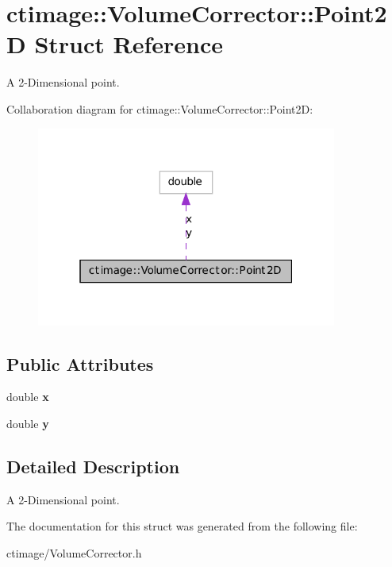 \hypertarget{structctimage_1_1_volume_corrector_1_1_point2_d}{
\section{ctimage::VolumeCorrector::Point2D Struct Reference}
\label{structctimage_1_1_volume_corrector_1_1_point2_d}
}


A 2-\/Dimensional point.  




Collaboration diagram for ctimage::VolumeCorrector::Point2D:\nopagebreak
\begin{figure}[H]
\begin{center}
\leavevmode
\includegraphics[width=280pt]{structctimage_1_1_volume_corrector_1_1_point2_d__coll__graph}
\end{center}
\end{figure}
\subsection*{Public Attributes}
\begin{DoxyCompactItemize}
\item 
\hypertarget{structctimage_1_1_volume_corrector_1_1_point2_d_a52e8a66faf11149515762ff083921ea3}{
double {\bfseries x}}
\label{structctimage_1_1_volume_corrector_1_1_point2_d_a52e8a66faf11149515762ff083921ea3}

\item 
\hypertarget{structctimage_1_1_volume_corrector_1_1_point2_d_ae95bae02c469e7dabe1d52b35e2d824a}{
double {\bfseries y}}
\label{structctimage_1_1_volume_corrector_1_1_point2_d_ae95bae02c469e7dabe1d52b35e2d824a}

\end{DoxyCompactItemize}


\subsection{Detailed Description}
A 2-\/Dimensional point. 

The documentation for this struct was generated from the following file:\begin{DoxyCompactItemize}
\item 
ctimage/VolumeCorrector.h\end{DoxyCompactItemize}
